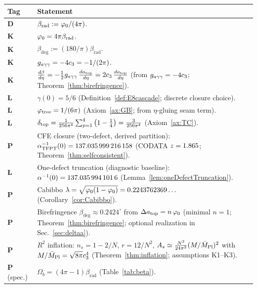 \begin{center}
\renewcommand{\arraystretch}{1.2}
\begin{tabular}{@{}lp{12cm}@{}}
\toprule
\textbf{Tag} & \textbf{Statement}\\
\midrule
\textbf{D} & $\beta_{\text{rad}} := \varphi_0/(4\pi)$.\\
\textbf{K} & $\varphi_0 = 4\pi\beta_{\text{rad}}$.\\
\textbf{K} & $\beta_{\text{deg}} := (180/\pi)\beta_{\text{rad}}$.\\
\textbf{K} & $g_{a\gamma\gamma} = -4c_3 = -1/(2\pi)$.\\
\textbf{K} & $\frac{d\beta}{d\eta} = -\frac{1}{2}g_{a\gamma\gamma}\,\frac{d a_{\text{top}}}{d\eta} = 2c_3\,\frac{d a_{\text{top}}}{d\eta}$ (from $g_{a\gamma\gamma}=-4c_3$; Theorem~\ref{thm:birefringence}).\\
\textbf{L} & $\gamma(0)=5/6$ (Definition~\ref{def:E8cascade}; discrete closure choice).\\
\textbf{L} & $\varphi_{\mathrm{tree}} = 1/(6\pi)$ (Axiom~\ref{ax:GB}; from $\eta$-gluing seam term).\\
\textbf{L} & $\delta_{\mathrm{top}} = \frac{1}{256\pi^4}\sum_{p=1}^{4}\left(1-\frac{1}{4}\right)=\frac{3}{256\pi^4}$ (Axiom~\ref{ax:TC}).\\
\textbf{P} & CFE closure (two-defect, derived partition): $\alpha^{-1}_{\text{TFPT}}(0)=\num[round-mode=places,round-precision=12]{\TFPTalphaInvGOverFourNum}$ (CODATA $z=\num[round-mode=places,round-precision=3]{\TFPTalphaZGOverFourNum}$; Theorem~\ref{thm:selfconsistent}).\\
\textbf{L} & One-defect truncation (diagnostic baseline): $\alpha^{-1}(0)=\num[round-mode=places,round-precision=10]{\TFPTalphaInvSelfNum}$ (Lemma~\ref{lem:oneDefectTruncation}).\\
\textbf{P} & Cabibbo $\lambda = \sqrt{\varphi_0(1-\varphi_0)}=0.2243762369\ldots$ (Corollary~\ref{cor:Cabibbo}).\\
\textbf{P} & Birefringence $\beta_{\text{deg}} \approx 0.2424^\circ$ from $\Delta a_{\text{top}} = n\,\varphi_0$ (minimal $n=1$; Theorem~\ref{thm:birefringence}; optional realization in Sec.~\ref{sec:deltaa}).\\
\textbf{P} & $R^2$ inflation: $n_s=1-2/N$, $r=12/N^2$, $A_s \simeq \frac{N^2}{24\pi^2}(M/\bar{M}_{\mathrm{Pl}})^2$ with $M/\bar{M}_{\mathrm{Pl}}=\sqrt{8\pi}c_3^4$ (Theorem~\ref{thm:inflation}; assumptions K1--K3).\\
\textbf{P} (spec.) & $\Omega_b = (4\pi-1)\beta_{\text{rad}}$ (Table~\ref{tab:beta}).\\
\bottomrule
\end{tabular}
\end{center}

